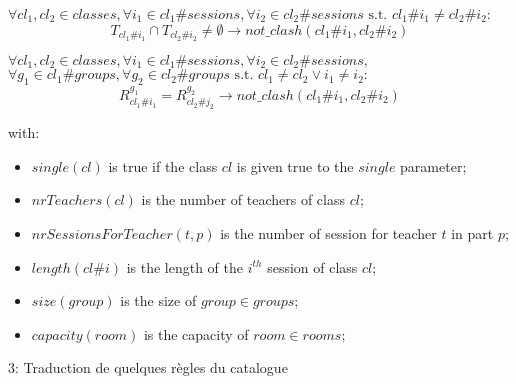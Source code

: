 $\forall cl_1, cl_2 \in classes, \forall i_1 \in cl_1\#sessions, \forall i_2 \in cl_2\#sessions \mbox{ s.t. } cl_1\#i_1 \neq cl_2\#i_2 :$
\begin{equation}
    T_{{cl_1}\#{i_1}} \cap T_{{cl_2}\#{i_2}} \neq \emptyset \longrightarrow not\_clash(cl_1\#i_1, cl_2\#i_2)
\end{equation}

$\forall cl_1, cl_2 \in classes, \forall i_1 \in cl_1\#sessions, \forall i_2 \in cl_2\#sessions,$\newline
\indent$\forall g_1 \in cl_1\#groups, \forall g_2 \in cl_2\#groups \mbox{ s.t. } cl_1 \neq cl_2 \vee i_1 \neq i_2:$
\begin{equation}
    R_{{cl_1}\#{i_1}}^{g_1} = R_{{cl_2}\#{j_2}}^{g_2} \longrightarrow not\_clash(cl_1\#i_1, cl_2\#i_2)
\end{equation}

with:
\begin{itemize}
    \item $single(cl)$ is true if the class $cl$ is given true to the $single$ parameter;
    \item $nrTeachers(cl)$ is the number of teachers of class $cl$;
    \item $nrSessionsForTeacher(t,p)$ is the number of session for teacher $t$ in part $p$;
    \item $length(cl\#i)$ is the length of the $i^{th}$ session of class $cl$;
    \item $size(group)$ is the size of $group \in groups$;
    \item $capacity(room)$ is the capacity of $room \in rooms$;
\end{itemize}


3: Traduction de quelques règles du catalogue 

